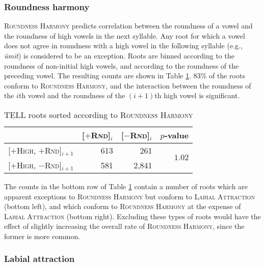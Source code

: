 \subsubsection{Roundness harmony}

\textsc{Roundness Harmony} predicts correlation between the roundness of a vowel and the roundness of high vowels in the next syllable. Any root for which a vowel does not agree in roundness with a high vowel in the following syllable (e.g., \emph{ümit}) is considered to be an exception. Roots are binned according to the roundness of non-initial high vowels, and according to the roundness of the preceding vowel. 
The resulting counts are shown in Table \ref{rhs}. 83\% of the roots conform to \textsc{Roundness Harmony}, and the interaction between the roundness of the $i$th vowel and the roundness of the $(i +1)$th high vowel is significant.

\begin{table}[ht]
\centering
\begin{tabular}{lrrr}
\toprule
                                              & [$+$\textsc{Rnd}]$_i$ & [$-$\textsc{Rnd}]$_i$ & $p$-value                      \\
\midrule
\buf{}[$+$\textsc{High}, $+$\textsc{Rnd}]$_{i+1}$ & 613                   &   261                 & \multirow{2}{*}{$1.02$\e{-36}} \\
\buf{}[$+$\textsc{High}, $-$\textsc{Rnd}]$_{i+1}$ & 581                   & 2,841                                                  \\
\bottomrule
\end{tabular}
\caption{TELL roots sorted according to \textsc{Roundness Harmony}}
\label{rhs}
\end{table}

\noindent
The counts in the bottom row of Table \ref{rhs} contain a number of roots which are apparent exceptions to \textsc{Roundness Harmony} but conform to \textsc{Labial Attraction} (bottom left), and which conform to \textsc{Roundness Harmony} at the expense of \textsc{Labial Attraction} (bottom right). Excluding these types of roots would have the effect of slightly increasing the overall rate of \textsc{Roundness Harmony}, since the former is more common.

\subsubsection{Labial attraction}

